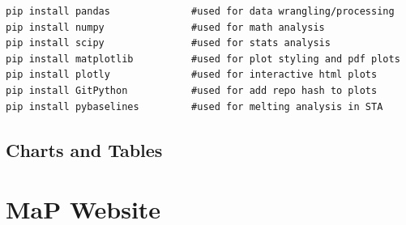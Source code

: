 \documentclass[12pt,oneside]{book}
\begin{document}
\begin{verbatim}
pip install pandas              #used for data wrangling/processing
pip install numpy               #used for math analysis
pip install scipy               #used for stats analysis
pip install matplotlib          #used for plot styling and pdf plots
pip install plotly              #used for interactive html plots
pip install GitPython           #used for add repo hash to plots
pip install pybaselines         #used for melting analysis in STA
\end{verbatim}

\section{Charts and Tables}
\label{sec:charts}

\chapter{MaP Website}


% 
\end{document}
